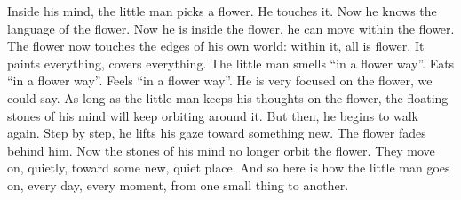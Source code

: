 {Inside his mind, the little man picks a flower. He touches it. Now he knows the language of the flower. Now he is inside the flower, he can move within the flower. The flower now touches the edges of his own world: within it, all is flower. It paints everything, covers everything. The little man smells “in a flower way”. Eats “in a flower way”. Feels “in a flower way”. He is very focused on the flower, we could say.
As long as the little man keeps his thoughts on the flower, the floating stones of his mind will keep orbiting around it. But then, he begins to walk again. Step by step, he lifts his gaze toward something new. The flower fades behind him. Now the stones of his mind no longer orbit the flower. They move on, quietly, toward some new, quiet place. And so here is how the little man goes on, every day, every moment, from one small thing to another.
}


